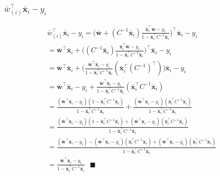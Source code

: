 \documentclass[11pt, oneside]{article}   	%
\begin{document}
\subsubsection{$\bar{w}_{(i)}^\top \boldsymbol{\bar{x}}_i - y_i$}
\begin{gather*}
\bar{w}_{(i)}^\top \boldsymbol{\bar{x}}_i - y_i = \bigg(\boldsymbol{\bar{w}} + (C^{-1}\boldsymbol{\bar{x}}_i)  \frac{\boldsymbol{\bar{x}}_i^\top \boldsymbol{\bar{w}} - y_i} {1 - \boldsymbol{\bar{x}}_i^\top C^{-1} \boldsymbol{\bar{x}}_i}\bigg)^\top \boldsymbol{\bar{x}}_i - y_i\\ 
= \boldsymbol{\bar{w}}^\top \boldsymbol{\bar{x}}_i + \bigg((C^{-1}\boldsymbol{\bar{x}}_i)  \frac{\boldsymbol{\bar{x}}_i^\top \boldsymbol{\bar{w}} - y_i} {1 - \boldsymbol{\bar{x}}_i^\top C^{-1} \boldsymbol{\bar{x}}_i}\bigg)^\top \boldsymbol{\bar{x}}_i - y_i\\
= \boldsymbol{\bar{w}}^\top\boldsymbol{\bar{x}}_i + \bigg( \frac{\boldsymbol{\bar{w}}^\top \boldsymbol{\bar{x}}_i  - y_i} {1 - \boldsymbol{\bar{x}}_i^\top C^{-1} \boldsymbol{\bar{x}}_i} (\boldsymbol{\bar{x}}_i^\top (C^{-1})^\top) \bigg) \boldsymbol{\bar{x}}_i - y_i\\
= \boldsymbol{\bar{w}}^\top\boldsymbol{\bar{x}}_i - y_i + \frac{\boldsymbol{\bar{w}}^\top \boldsymbol{\bar{x}}_i  - y_i} {1 - \boldsymbol{\bar{x}}_i^\top C^{-1} \boldsymbol{\bar{x}}_i} (\boldsymbol{\bar{x}}_i^\top C^{-1} \boldsymbol{\bar{x}}_i )\\
= \frac{(\boldsymbol{\bar{w}}^\top \boldsymbol{\bar{x}}_i - y_i)(1 - \boldsymbol{\bar{x}}_i^\top C^{-1} \boldsymbol{\bar{x}}_i)}{1 - \boldsymbol{\bar{x}}_i^\top C^{-1} \boldsymbol{\bar{x}}_i} + \frac{(\boldsymbol{\bar{w}}^\top \boldsymbol{x}_i  - y_i) (\boldsymbol{\bar{x}}_i^\top C^{-1} \boldsymbol{\bar{x}}_i )} {1 - \boldsymbol{\bar{x}}_i^\top C^{-1} \boldsymbol{\bar{x}}_i} \\
= \frac{(\boldsymbol{\bar{w}}^\top \boldsymbol{\bar{x}}_i - y_i)(1 - \boldsymbol{\bar{x}}_i^\top C^{-1} \boldsymbol{\bar{x}}_i) + (\boldsymbol{\bar{w}}^\top \boldsymbol{x}_i  - y_i) (\boldsymbol{\bar{x}}_i^\top C^{-1} \boldsymbol{\bar{x}}_i )} {1 - \boldsymbol{\bar{x}}_i^\top C^{-1} \boldsymbol{\bar{x}}_i} \\
= \frac{(\boldsymbol{\bar{w}}^\top \boldsymbol{\bar{x}}_i - y_i) - (\boldsymbol{\bar{w}}^\top \boldsymbol{\bar{x}}_i - y_i)(\boldsymbol{\bar{x}}_i^\top C^{-1} \boldsymbol{x}_i) + (\boldsymbol{\bar{w}}^\top \boldsymbol{\bar{x}}_i  - y_i) (\boldsymbol{\bar{x}}_i^\top C^{-1} \boldsymbol{\bar{x}}_i )} {1 - \boldsymbol{\bar{x}}_i^\top C^{-1} \boldsymbol{\bar{x}}_i} \\
= \frac{\boldsymbol{\bar{w}}^\top \boldsymbol{\bar{x}}_i - y_i} {1 - \boldsymbol{\bar{x}}_i^\top C^{-1} \boldsymbol{\bar{x}}_i} \text{ } \blacksquare
\end{gather*}
\end{document}
